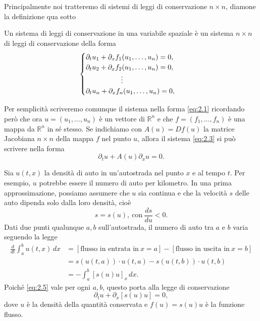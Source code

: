 Principalmente noi tratteremo di sistemi di leggi di conservazione $n\times n$, diamone la definizione qua sotto
\begin{definizione}
    Un sistema di leggi di conservazione in una variabile spaziale è un sistema $n\times n$ di leggi di conservazione della forma
    \begin{equation}\label{eq:2.3}
        \begin{cases}
            \partial_{t}u_{1}+\partial_{x}f_{1}(u_{1}, \ldots, u_{n})=0,\\
            \partial_{t}u_{2}+\partial_{x}f_{2}(u_{1}, \ldots, u_{n})=0,\\
            \hspace{1.75cm} \vdots\\
            \partial_{t}u_{n}+\partial_{x}f_{n}(u_{1}, \ldots, u_{n})=0,\\
        \end{cases}
    \end{equation}
\end{definizione}

Per semplicità scriveremo comunque il sistema nella forma \eqref{eq:2.1} ricordando però che ora $u = (u_{1},\ldots,u_{n})$ è un vettore di $\mathbb{R}^{n}$ e che $f=(f_{1},\ldots, f_{n})$ è una mappa da $\mathbb{R}^{n}$ in sé stesso. Se indichiamo con $A(u) = Df(u)$ la matrice Jacobiana $n\times n$ della mappa $f$ nel punto $u$, allora il sistema \eqref{eq:2.3} si può scrivere nella forma 
\begin{equation}\label{eq:2.4}
    \partial_{t}u+A(u)\partial_{x}u=0.
\end{equation}

\begin{esempio}
Sia $u(t,x)$ la densità di auto in un'autostrada nel punto $x$ e al tempo $t$. Per esempio, $u$ potrebbe essere il numero di auto per kilometro. In una prima approssimazione, possiamo assumere che $u$ sia continua e che la velocità $s$ delle auto dipenda solo dalla loro densità, cioè
$$ s = s(u), \ \text{con} \ \frac{ds}{du}<0.$$
Dati due punti qualunque $a, b$ sull'autostrada, il numero di auto tra $a$ e $b$ varia seguendo la legge
\begin{align} \label{eq:2.5}
    \frac{d}{dt}\int_{a}^{b}u(t,x)\,dx &= \left[\text{flusso in entrata in} \ x = a\right] - \left[\text{flusso in uscita in} \ x = b\right] \nonumber\\
    &= s(u(t,a))\cdot u(t,a) - s(u(t,b))\cdot u(t,b) \nonumber\\
    &= -\int_{a}^{b}\left[s(u)u\right]_{x}\,dx.
\end{align}
Poiché \eqref{eq:2.5} vale per ogni $a, b$, questo porta alla legge di conservazione
$$ \partial_{t}u + \partial_{x}\left[s(u)u\right] = 0, $$
dove $u$ è la densità della quantità conservata e $f(u) = s(u)u$ è la funzione flusso.
\end{esempio}

